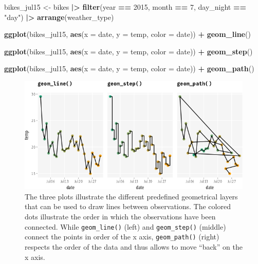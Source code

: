 \documentclass[
]{krantz}
\makeatletter
\newenvironment{Shaded}{\begin{snugshade}}{\end{snugshade}}
\newcommand{\AttributeTok}[1]{\textcolor[rgb]{0.27,0.27,0.27}{#1}}
\newcommand{\DecValTok}[1]{\textcolor[rgb]{0.06,0.06,0.06}{#1}}
\newcommand{\FunctionTok}[1]{\textcolor[rgb]{0.27,0.27,0.27}{\textbf{#1}}}
\newcommand{\NormalTok}[1]{#1}
\newcommand{\OtherTok}[1]{\textcolor[rgb]{0.37,0.37,0.37}{#1}}
\newcommand{\SpecialCharTok}[1]{\textcolor[rgb]{0.43,0.43,0.43}{\textbf{#1}}}
\newcommand{\StringTok}[1]{\textcolor[rgb]{0.5,0.5,0.5}{#1}}
\newenvironment{kframe}{%
\medskip{}
\setlength{\fboxsep}{.8em}
 \def\at@end@of@kframe{}%
 \ifinner\ifhmode%
  \def\at@end@of@kframe{\end{minipage}}%
  \begin{minipage}{\columnwidth}%
 \fi\fi%
 \def\FrameCommand##1{\hskip\@totalleftmargin \hskip-\fboxsep
 \colorbox{shadecolor}{##1}\hskip-\fboxsep
     \hskip-\linewidth \hskip-\@totalleftmargin \hskip\columnwidth}%
 \MakeFramed {\advance\hsize-\width
   \@totalleftmargin\z@ \linewidth\hsize
   \@setminipage}}%
 {\par\unskip\endMakeFramed%
 \at@end@of@kframe}
\renewenvironment{Shaded}{\begin{kframe}}{\end{kframe}}
\makeatother
\begin{document}
\begin{Shaded}
\begin{Highlighting}[]
\NormalTok{bikes\_jul15 }\OtherTok{\textless{}{-}}\NormalTok{ bikes }\SpecialCharTok{|\textgreater{}} 
  \FunctionTok{filter}\NormalTok{(year }\SpecialCharTok{==} \DecValTok{2015}\NormalTok{, month }\SpecialCharTok{==} \DecValTok{7}\NormalTok{, day\_night }\SpecialCharTok{==} \StringTok{"day"}\NormalTok{) }\SpecialCharTok{|\textgreater{}} 
  \FunctionTok{arrange}\NormalTok{(weather\_type)}

\FunctionTok{ggplot}\NormalTok{(bikes\_jul15, }\FunctionTok{aes}\NormalTok{(}\AttributeTok{x =}\NormalTok{ date, }\AttributeTok{y =}\NormalTok{ temp, }\AttributeTok{color =}\NormalTok{ date)) }\SpecialCharTok{+}
  \FunctionTok{geom\_line}\NormalTok{()}

\FunctionTok{ggplot}\NormalTok{(bikes\_jul15, }\FunctionTok{aes}\NormalTok{(}\AttributeTok{x =}\NormalTok{ date, }\AttributeTok{y =}\NormalTok{ temp, }\AttributeTok{color =}\NormalTok{ date)) }\SpecialCharTok{+}
  \FunctionTok{geom\_step}\NormalTok{()}

\FunctionTok{ggplot}\NormalTok{(bikes\_jul15, }\FunctionTok{aes}\NormalTok{(}\AttributeTok{x =}\NormalTok{ date, }\AttributeTok{y =}\NormalTok{ temp, }\AttributeTok{color =}\NormalTok{ date)) }\SpecialCharTok{+}
  \FunctionTok{geom\_path}\NormalTok{()}
\end{Highlighting}
\end{Shaded}

\begin{figure}
\centering
\includegraphics{bookdown_files/figure-latex/07layerPredefinedDefaultVariants-1.png}
\caption{\label{fig:07layerPredefinedDefaultVariants}The three plots illustrate the different predefined geometrical layers that can be used to draw lines between observations. The colored dots illustrate the order in which the observations have been connected. While \texttt{geom\_line()} (left) and \texttt{geom\_step()} (middle) connect the points in order of the x axis, \texttt{geom\_path()} (right) respects the order of the data and thus allows to move ``back'' on the x axis.}
\end{figure}
\end{document}
